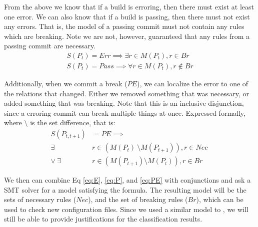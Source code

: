 From the above we know that if a build is erroring, then there must exist at least one error.
We can also know that if a build is passing, then there must not exist any errors.
That is, the model of a passing commit must not contain any rules which are breaking.
Note we are not, however, guaranteed that any rules from a passing commit are necessary.
\begin{align}
  S(P_t) = Err \implies \exists r \in  M (P_t), r \in Br \label{eq:E}\\
  S(P_t) = Pass \implies \forall r \in  M (P_t), r \notin Br \label{eq:P}
\end{align}

Additionally, when we commit a break ($PE$), we can localize the error to one of the relations that changed.
Either we removed something that was necessary, or added something that was breaking.
Note that this is an inclusive disjunction, since a erroring commit can break multiple things at once.
Expressed formally, where $\setminus$ is the set difference, that is:
\begin{align}
  S(P_{t,t+1}) &= PE \implies \nonumber \\
  \exists& r \in (M(P_{t})\ \setminus M(P_{t+1})), r \in Nec\ \nonumber \\
  \lor \ \exists& r \in (M(P_{t+1}) \setminus M(P_{t})), r \in Br \label{eq:PE}
\end{align}

We then can combine Eq \ref{eq:E}, \ref{eq:P}, and \ref{eq:PE} with
conjunctions and ask a SMT solver for a model satisfying the formula.
The resulting model will be the sets of necessary rules ($Nec$), and the set of breaking rules ($Br$), which can be used to check new configuration files.
Since we used a similar model to \app, we will still be able to provide justifications for the classification results.

